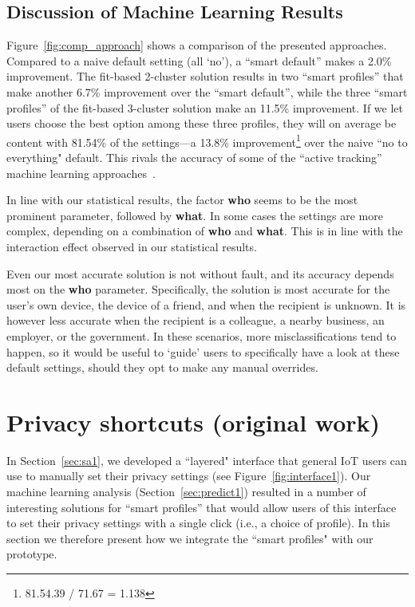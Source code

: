 \subsection{Discussion of Machine Learning Results}
Figure~\ref{fig:comp_approach} shows a comparison of the presented approaches. Compared to a naive default setting (all `no'), a ``smart default'' makes a 2.0\% improvement. The fit-based 2-cluster solution results in two ``smart profiles'' that make another 6.7\% improvement over the ``smart default'', while the three ``smart profiles'' of the fit-based 3-cluster solution make an 11.5\% improvement. If we let users choose the best option among these three profiles, they will on average be content with 81.54\% of the settings---a 13.8\% improvement\footnote{81.54.39 / 71.67 = 1.138} over the naive ``no to everything" default. This rivals the accuracy of some of the ``active tracking'' machine learning approaches~\cite{sadeh2009understanding}.

In line with our statistical results, the factor \textbf{who} seems to be the most prominent parameter, followed by \textbf{what}. In some cases the settings are more complex, depending on a combination of \textbf{who} and \textbf{what}. This is in line with the interaction effect observed in our statistical results.

Even our most accurate solution is not without fault, and its accuracy depends most on the \textbf{who} parameter. Specifically, the solution is most accurate for the user's own device, the device of a friend, and when the recipient is unknown. It is however less accurate when the recipient is a colleague, a nearby business, an employer, or the government. In these scenarios, more misclassifications tend to happen, so it would be useful to `guide' users to specifically have a look at these default settings, should they opt to make any manual overrides.

\section{Privacy shortcuts (original work)}\label{sec:design1}
In Section~\ref{sec:sa1}, we developed a ``layered" interface that general IoT users can use to manually set their privacy settings (see Figure~\ref{fig:interface1}). Our machine learning analysis (Section~\ref{sec:predict1}) resulted in a number of interesting solutions for ``smart profiles'' that would allow users of this interface to set their privacy settings with a single click (i.e., a choice of profile). In this section we therefore present how we integrate the ``smart profiles" with our prototype. 

